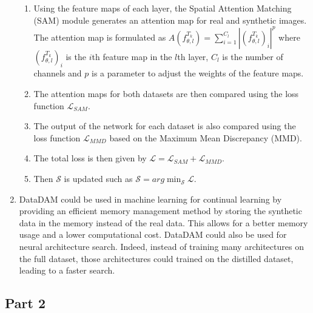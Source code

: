 \documentclass[conference]{IEEEtran}
\begin{document}
\begin{enumerate}[label=(\alph*)]
\begin{enumerate}[label=(\arabic*)]
        \item Using the feature maps of each layer, the Spatial Attention Matching (SAM) module generates an attention map for real and synthetic images. The attention map is formulated as $A(f_{\theta,l}^{T_k}) = \sum_{i=1}^{C_l} | (f_{\theta,l}^{T_k})_i|^p$ where $(f_{\theta,l}^{T_k})_i$ is the $i$th feature map in the $l$th layer, $C_l$ is the number of channels and $p$ is a parameter to adjust the weights of the feature maps.
        \item The attention maps for both datasets are then compared using the loss function $\mathcal{L}_{SAM}$.
        \item The output of the network for each dataset is also compared using the loss function $\mathcal{L}_{MMD}$ based on the Maximum Mean Discrepancy (MMD).
        \item The total loss is then given by $\mathcal{L} = \mathcal{L}_{SAM} + \mathcal{L}_{MMD}$.
        \item Then $\mathcal{S}$ is updated such as $\mathcal{S} = arg \min_{\mathcal{S}} \mathcal{L}$.
    \end{enumerate}
    \vspace{3mm}
    \item DataDAM could be used in machine learning for continual learning by providing an efficient memory management method by storing the synthetic data in the memory instead of the real data. This allows for a better memory usage and a lower computational cost. DataDAM could also be used for neural architecture search. Indeed, instead of training many architectures on the full dataset, those architectures could trained on the distilled dataset, leading to a faster search.
\end{enumerate}

\subsection{Part 2}
\begin{enumerate}[label=(\alph*)]

\end{enumerate}



\end{document}
